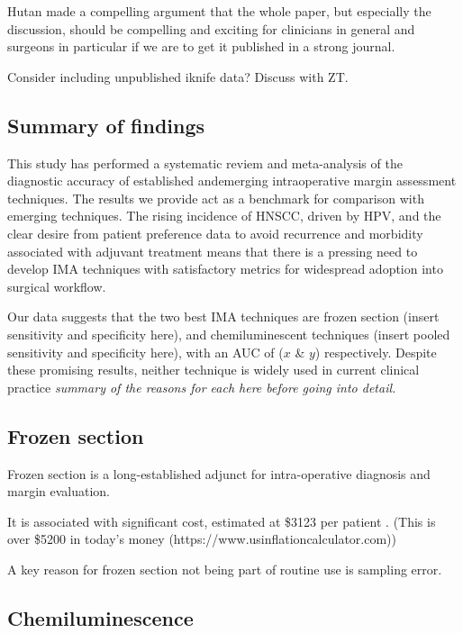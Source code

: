 Hutan made a compelling argument that the whole paper, but especially the discussion, should be compelling and exciting for clinicians in general and surgeons in particular if we are to get it published in a strong journal.

Consider including unpublished iknife data? Discuss with ZT.

\subsection{Summary of findings}

This study has performed a systematic reviem and meta-analysis of the diagnostic accuracy of established andemerging intraoperative margin assessment techniques.
The results we provide act as a benchmark for comparison with emerging techniques.
The rising incidence of HNSCC, driven by HPV, and the clear desire from patient preference data to avoid recurrence and morbidity associated with adjuvant treatment means that there is a pressing need to develop IMA techniques with satisfactory metrics for widespread adoption into surgical workflow.

Our data suggests that the two best IMA techniques are frozen section (insert sensitivity and specificity here), and chemiluminescent techniques (insert pooled sensitivity and specificity here), with an AUC of ($x$ \& $y$) respectively.
Despite these promising results, neither technique is widely used in current clinical practice
\emph{summary of the reasons for each here before going into detail.}

\subsection{Frozen section}

Frozen section is a long-established adjunct for intra-operative diagnosis and margin evaluation.

It is associated with significant cost, estimated at \$3123 per patient \cite{dinardoAccuracyUtilityCost2000}. 
(This is over \$5200 in today's money (https://www.usinflationcalculator.com))

A key reason for frozen section not being part of routine use is sampling error.

\subsection{Chemiluminescence}



